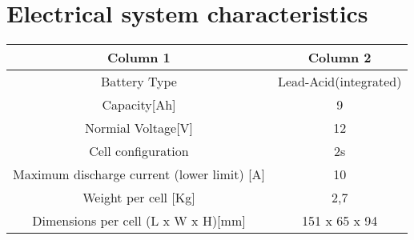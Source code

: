 \section{Electrical system characteristics}
\begin{table}
    \centering
    \begin{adjustbox}{width=\textwidth,center}
    \begin{tabular}{|c|c|}
       \hline
       \textbf{Column 1} & \textbf{Column 2}  \\
       \hline
       Battery Type & Lead-Acid(integrated)\\
       \hline
       Capacity[Ah] & 9 \\
       \hline
       Normial Voltage[V] & 12 \\
       \hline
       Cell configuration & 2s \\
       \hline
       Maximum discharge current (lower limit) [A] & 10 \\
       \hline
       Weight per cell [Kg] & 2,7 \\
       \hline 
       Dimensions per cell (L x W x H)[mm] & 151 x 65 x 94 \\
       \hline 
    \end{tabular}
    \end{adjustbox}
    \label{Low Voltage Battery Specs}
\end{table}    

